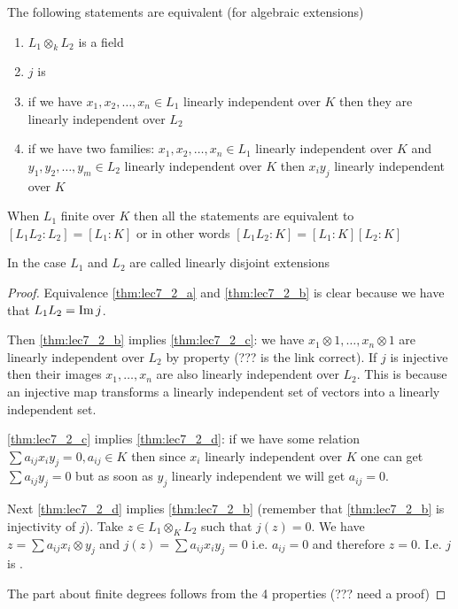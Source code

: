 \begin{theorem}
  The following statements are equivalent (for algebraic extensions)
  \begin{enumerate}
  \item $L_1 \otimes_k L_2$ is a field \label{thm:lec7_2_a}
  \item $j$ is  \label{thm:lec7_2_b}
  \item if we have $x_1, x_2, \dots, x_n \in L_1$ linearly independent
    over $K$ then they are linearly independent
    over $L_2$ \label{thm:lec7_2_c}
  \item if we have two families: $x_1, x_2, \dots, x_n \in L_1$ linearly independent
    over $K$ and  $y_1, y_2, \dots, y_m \in L_2$ linearly independent
    over $K$ then $x_i y_j$ linearly independent over $K$
    \label{thm:lec7_2_d}
  \end{enumerate}
  When $L_1$ finite over $K$ then all the statements are equivalent to
  $\left[L_1 L_2 : L_2\right] = \left[L_1 : K\right]$ or in other
  words
  $\left[L_1 L_2 : K\right] = \left[L_1 : K\right] \left[L_2 :
    K\right]$
  \begin{definition}
    In the case $L_1$ and $L_2$ are called linearly disjoint extensions
    \label{def:linearlydisjoint}
  \end{definition}
  \begin{proof}
    Equivalence \ref{thm:lec7_2_a} and \ref{thm:lec7_2_b} is clear
    because we have that $L_1 L_2 = \operatorname{Im} j$.

    Then \ref{thm:lec7_2_b} implies \ref{thm:lec7_2_c}: we have
    $x_1 \otimes 1, \dots, x_n \otimes 1$ are linearly independent
    over $L_2$ by  property (??? is the link
    correct). If $j$ is injective then their images $x_1, \dots, x_n$
    are also linearly independent over $L_2$. This is because an
    injective map transforms a linearly independent set of vectors
    into a linearly independent set.

    \ref{thm:lec7_2_c} implies \ref{thm:lec7_2_d}: if we have some
    relation $\sum a_{ij} x_i y_j = 0, a_{ij} \in K$ then since $x_i$
    linearly independent over $K$ one can get $\sum a_{ij} y_j = 0$
    but as soon as $y_j$ linearly independent we will get $a_{ij} =
    0$.

    Next \ref{thm:lec7_2_d} implies \ref{thm:lec7_2_b} (remember that
    \ref{thm:lec7_2_b} is injectivity of $j$). Take
    $z \in L_1 \otimes_K L_2$ such that $j\left(z\right) = 0$. We have
    $z = \sum a_{ij} x_i \otimes y_j$ and
    $j\left(z\right) = \sum a_{ij} x_i y_j = 0$ i.e. $a_{ij} = 0$ and
    therefore $z = 0$. I.e. $j$ is .

    The part about finite degrees follows from the 4 properties (???
    need a proof)
  \end{proof}
  \label{thm:lec7_2}
\end{theorem}

